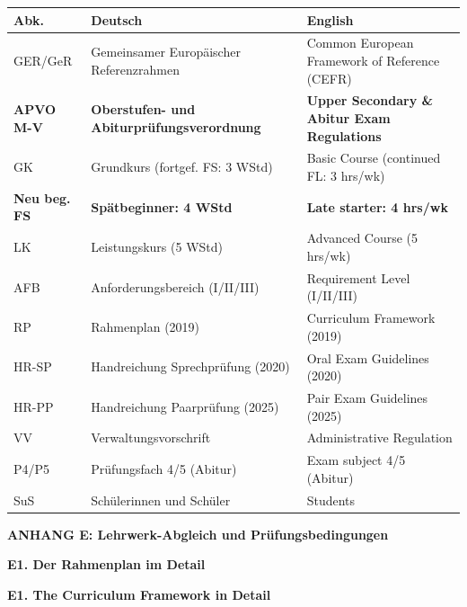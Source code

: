 \documentclass[10pt,a4paper]{article}
\newcommand{\secbil}[2]{%
\vspace{6pt}
\noindent\colorbox{spaet}{\parbox{0.48\textwidth}{\color{white}\bfseries\small #1}}%
\hfill%
\colorbox{english}{\parbox{0.48\textwidth}{\color{white}\bfseries\small #2}}
\vspace{3pt}
}
\begin{document}
\begin{center}
\scriptsize
\begin{tabular}{|l|p{5cm}|p{5cm}|}
\hline
\rowcolor{lightgray}
\textbf{Abk.} & \textbf{Deutsch} & \textbf{English} \\
\hline
GER/GeR & Gemeinsamer Europäischer Referenzrahmen & Common European Framework of Reference (CEFR) \\
\hline
\textbf{APVO M-V} & \textbf{Oberstufen- und Abiturprüfungsverordnung} & \textbf{Upper Secondary \& Abitur Exam Regulations} \\
\hline
GK & Grundkurs (fortgef. FS: 3 WStd) & Basic Course (continued FL: 3 hrs/wk) \\
\hline
\textcolor{spaet}{\textbf{Neu beg. FS}} & \textcolor{spaet}{\textbf{Spätbeginner: 4 WStd}} & \textcolor{spaet}{\textbf{Late starter: 4 hrs/wk}} \\
\hline
LK & Leistungskurs (5 WStd) & Advanced Course (5 hrs/wk) \\
\hline
AFB & Anforderungsbereich (I/II/III) & Requirement Level (I/II/III) \\
\hline
RP & Rahmenplan (2019) & Curriculum Framework (2019) \\
\hline
HR-SP & Handreichung Sprechprüfung (2020) & Oral Exam Guidelines (2020) \\
\hline
HR-PP & Handreichung Paarprüfung (2025) & Pair Exam Guidelines (2025) \\
\hline
VV & Verwaltungsvorschrift & Administrative Regulation \\
\hline
P4/P5 & Prüfungsfach 4/5 (Abitur) & Exam subject 4/5 (Abitur) \\
\hline
SuS & Schülerinnen und Schüler & Students \\
\hline
\end{tabular}
\end{center}

\newpage

\begin{center}
\colorbox{spanisch}{\parbox{0.95\textwidth}{\centering\color{white}\Large\bfseries\vspace{4pt}
ANHANG E: Lehrwerk-Abgleich und Prüfungsbedingungen
\vspace{4pt}}}
\end{center}

\vspace{4mm}

\secbil{E1. Der Rahmenplan im Detail}{E1. The Curriculum Framework in Detail}
\end{document}
